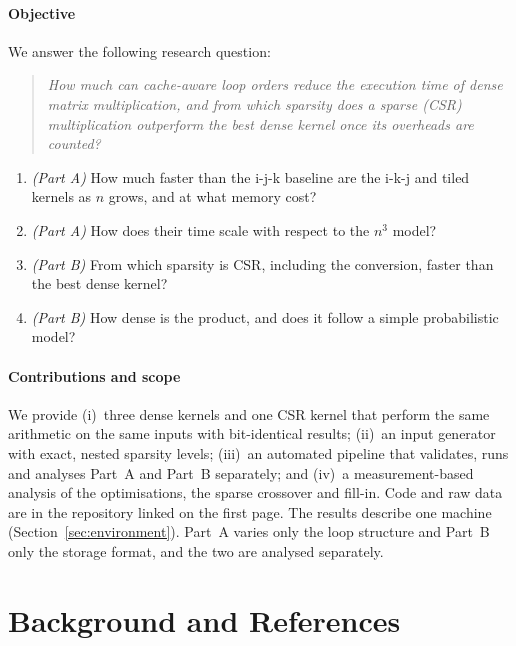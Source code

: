 \documentclass[conference,a4paper]{IEEEtran}
\begin{document}
\paragraph{Objective} We answer the following research question:

\begin{quote}
\emph{How much can cache-aware loop orders reduce the execution time of dense
matrix multiplication, and from which sparsity does a sparse (CSR)
multiplication outperform the best dense kernel once its overheads are
counted?}
\end{quote}

\begin{enumerate}[label=\textbf{RQ\arabic*.}, leftmargin=3.2em, itemsep=1pt]
  \item \emph{(Part A)} How much faster than the i-j-k baseline are the i-k-j
        and tiled kernels as $n$ grows, and at what memory cost?
  \item \emph{(Part A)} How does their time scale with respect to the $n^3$
        model?
  \item \emph{(Part B)} From which sparsity is CSR, including the conversion,
        faster than the best dense kernel?
  \item \emph{(Part B)} How dense is the product, and does it follow a simple
        probabilistic model?
\end{enumerate}

\paragraph{Contributions and scope} We provide (i)~three dense kernels and one
CSR kernel that perform the same arithmetic on the same inputs with
bit-identical results; (ii)~an input generator with exact, nested sparsity
levels; (iii)~an automated pipeline that validates, runs and analyses Part~A
and Part~B separately; and (iv)~a measurement-based analysis of the
optimisations, the sparse crossover and fill-in. Code and raw data are in the
repository linked on the first page. The results describe one machine
(Section~\ref{sec:environment}). Part~A varies only the loop structure and
Part~B only the storage format, and the two are analysed separately.

\section{Background and References}
\label{sec:background}
\end{document}
